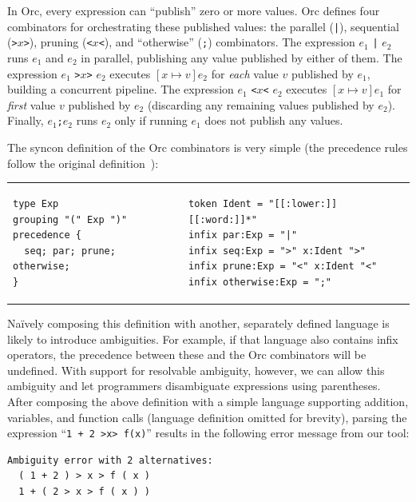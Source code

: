 \documentclass[acmsmall,review,anonymous]{acmart}\settopmatter{printfolios=true,printccs=false,printacmref=false}
\newcommand{\ocaml}{\lstinline[language={[objective]caml}]}
\begin{document}
In Orc, every expression can ``publish'' zero or more values. Orc
defines four combinators for orchestrating these published values:
the parallel (\ocaml{|}), sequential (\ocaml{>}$x$\ocaml{>}),
pruning (\ocaml{<}$x$\ocaml{<}), and ``otherwise'' (\ocaml{;})
combinators.
%
The expression $e_1$ \ocaml{|} $e_2$ runs $e_1$ and
$e_2$ in parallel, publishing any value published by either of
them.
%
The expression $e_1$ \ocaml{>}$x$\ocaml{>} $e_2$ executes
$[x\mapsto v]e_2$ for \emph{each} value $v$ published by $e_1$,
building a concurrent pipeline.
%
The expression $e_1$ \ocaml{<}$x$\ocaml{<} $e_2$ executes
$[x\mapsto v]e_1$ for \emph{first} value $v$ published by $e_2$
(discarding any remaining values published by $e_2$).
%
Finally, $e_1$\ocaml{;}$e_2$ runs $e_2$ only if running $e_1$ does
not publish any values.

The syncon definition of the Orc combinators is very simple (the
precedence rules follow the original
definition~\cite{kitchinOrc2009}):

\begin{tabular}{ll}
\small
\begin{lstlisting}[language=syncon,boxpos=t]
type Exp
grouping "(" Exp ")"
precedence {
  seq; par; prune; otherwise;
}
\end{lstlisting}
&
\small
\begin{lstlisting}[language=syncon,boxpos=t]
token Ident = "[[:lower:]][[:word:]]*"
infix par:Exp = "|"
infix seq:Exp = ">" x:Ident ">"
infix prune:Exp = "<" x:Ident "<"
infix otherwise:Exp = ";"
\end{lstlisting}
\end{tabular}\smallskip

\noindent
Na\"{i}vely composing this definition with another, separately
defined language is likely to introduce ambiguities. For example,
if that language also contains infix operators, the precedence
between these and the Orc combinators will be undefined. With
support for resolvable ambiguity, however, we can allow this
ambiguity and let programmers disambiguate expressions using
parentheses. After composing the above definition with a simple
language supporting addition, variables, and function calls
(language definition omitted for brevity), parsing the expression
%
``\ocaml{1 + 2 >x> f(x)}''
%
results in the following error message from our tool:

{\small
\begin{lstlisting}[language={[objective]caml}]
Ambiguity error with 2 alternatives:
  ( 1 + 2 ) > x > f ( x )
  1 + ( 2 > x > f ( x ) )
\end{lstlisting}
}
\end{document}
